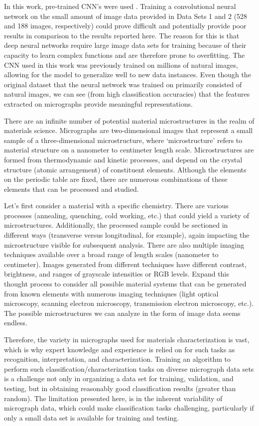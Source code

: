In this work, pre-trained CNN's were used \cite{Krizhevsky2012}.  Training a convolutional neural network on the small amount of image data provided in Data Sets 1 and 2 (528 and 188 images, respectively) could prove difficult and potentially provide poor results in comparison to the results reported here. The reason for this is that deep neural networks require large image data sets for training because of their capacity to learn complex functions and are therefore prone to overfitting.  The CNN used in this work was previously trained on millions of natural images, allowing for the model to generalize well to new data instances. Even though the original dataset that the neural network was trained on primarily consisted of natural images, we can see (from high classification accuracies) that the features extracted on micrographs provide meaningful representations.

There are an infinite number of potential material microstructures in the realm of materials science.  Micrographs are two-dimensional images that represent a small sample of a three-dimensional microstructure, where `microstructure' refers to material structure on a nanometer to centimeter length scale.  Microstructures are formed from thermodynamic and kinetic processes, and depend on the crystal structure (atomic arrangement) of constituent elements.  Although the elements on the periodic table are fixed, there are numerous combinations of these elements that can be processed and studied. 

Let's first consider a material with a specific chemistry. There are various processes (annealing, quenching, cold working, etc.) that could yield a variety of microstructures.  Additionally, the processed sample could be sectioned in different ways (transverse versus longitudinal, for example), again impacting the microstructure visible for subsequent analysis.  There are also multiple imaging techniques available over a broad range of length scales (nanometer to centimeter).  Images generated from different techniques have different contrast, brightness, and ranges of grayscale intensities or RGB levels.  Expand this thought process to consider all possible material systems that can be generated from known elements with numerous imaging techniques (light optical microscopy, scanning electron microscopy, transmission electron microscopy, etc.).  The possible microstructures we can analyze in the form of image data seems endless.  

Therefore, the variety in micrographs used for materials characterization is vast, which is why expert knowledge and experience is relied on for such tasks as recognition, interpretation, and characterization.  Training an algorithm to perform such classification/characterization tasks on diverse micrograph data sets is a challenge not only in organizing a data set for training, validation, and testing, but in obtaining reasonably good classification results (greater than random).  The limitation presented here, is in the inherent variability of micrograph data, which could make classification tasks challenging, particularly if only a small data set is available for training and testing.  

